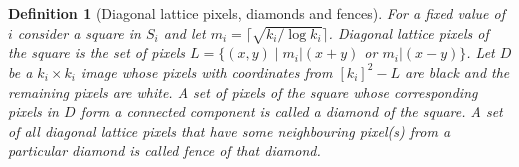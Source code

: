 \documentclass[11pt,english]{article}
\newtheorem{definition}{Definition}[section]
\numberwithin{figure}{section}
\begin{document}
\begin{definition}[Diagonal lattice pixels, diamonds and fences]
\label{def:diagonal_lattice_pixels_and_regions}
For a fixed value of $i$ consider a square in $S_{i}$ and let
$m_{i}=\lceil\sqrt{k_{i}/\log k_{i}}\rceil$. \emph{Diagonal lattice pixels} of
the square is the set of pixels $L=\{(x,y)\mid m_{i}|(x+y)$ or $m_{i}|(x-y)\}$. Let
$D$ be a $k_{i}\times k_{i}$ image whose pixels with coordinates from $[k_{i}]^{2}-L$ are black and the remaining pixels are white.
A set of pixels of the square whose corresponding pixels
in $D$ form a connected component is called a \emph{diamond} of the square.
A set of all diagonal lattice pixels that have some neighbouring
pixel(s) from a particular diamond is called \emph{fence} of that diamond.
\end{definition}
\end{document}
